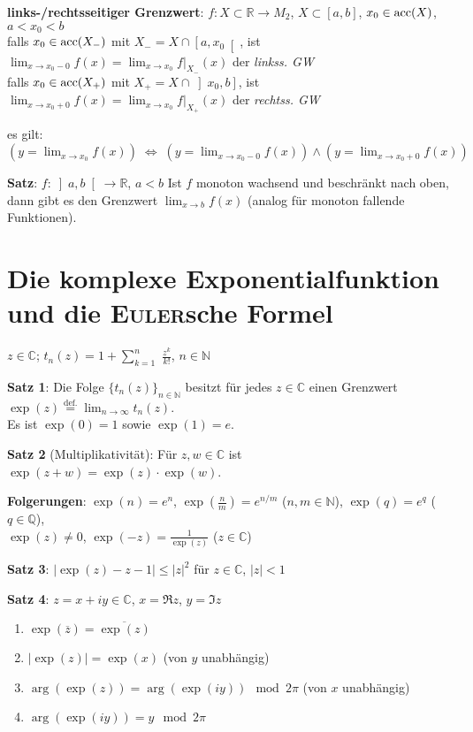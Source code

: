 \linie

\textbf{links-/rechtsseitiger Grenzwert}:
$f: X \subset \mathbb{R} \rightarrow M_2$, $X \subset [a,b]$,
$x_0 \in \operatorname{acc}(X)$, $a < x_0 < b$ \\
falls $x_0 \in \operatorname{acc}(X_-)$ mit $X_- = X \cap \left[a,x_0\right[$, ist
$\lim_{x \to x_0 - 0} f(x) = \lim_{x \to x_0} f|_{X_-}(x)$ der
\emph{linkss. GW} \\
falls $x_0 \in \operatorname{acc}(X_+)$ mit $X_+ = X \cap \left]x_0,b\right]$, ist
$\lim_{x \to x_0 + 0} f(x) = \lim_{x \to x_0} f|_{X_+}(x)$ der
\emph{rechtss. GW}

es gilt: $(y = \lim_{x \to x_0} f(x)) \;\Leftrightarrow\;
(y = \lim_{x \to x_0 - 0} f(x)) \land (y = \lim_{x \to x_0 + 0} f(x))$

\textbf{Satz}: $f: \left]a,b\right[ \rightarrow \mathbb{R}$, $a < b$ \qquad
Ist $f$ monoton wachsend und beschränkt nach oben, dann gibt es den Grenzwert
$\lim_{x \to b} f(x)$
(analog für monoton fallende Funktionen).

\section{%
    Die komplexe Exponentialfunktion und die \textsc{Euler}sche Formel%
}

$z \in \mathbb{C}$; \quad $t_n(z) = 1 + \sum_{k=1}^n$
{\large $\frac{z^k}{k!}$}, \quad $n \in \mathbb{N}$

\textbf{Satz 1}: Die Folge $\{t_n(z)\}_{n \in \mathbb{N}}$ besitzt für jedes
$z \in \mathbb{C}$ einen Grenzwert
$\exp(z) \overset{\text{def.}}{=} \lim_{n \to \infty} t_n(z)$. \\
Es ist $\exp(0) = 1$ sowie $\exp(1) = e$.

\textbf{Satz 2} (Multiplikativität): Für $z, w \in \mathbb{C}$ ist
$\exp(z + w) = \exp(z) \cdot \exp(w)$.

\textbf{Folgerungen}: $\exp(n) = e^n$, $\exp(\frac{n}{m}) = e^{n/m}$
($n, m \in \mathbb{N}$), $\exp(q) = e^q$ ($q \in \mathbb{Q}$), \\
$\exp(z) \not= 0$, $\exp(-z) = \frac{1}{\exp(z)}$ ($z \in \mathbb{C}$)

\textbf{Satz 3}: $|\exp(z) - z - 1| \le |z|^2$ für $z \in \mathbb{C}$,
$|z| < 1$

\textbf{Satz 4}: $z = x + iy \in \mathbb{C}$, $x = \Re z$, $y = \Im z$

\begin{enumerate}
    \item $\exp(\overline{z}) = \overline{\exp(z)}$

    \item $|\exp(z)| = \exp(x)$ \quad (von $y$ unabhängig)

    \item $\arg(\exp(z)) = \arg(\exp(iy)) \mod 2\pi$ \quad (von $x$ unabhängig)

    \item $\arg(\exp(iy)) = y \mod 2\pi$
\end{enumerate}

